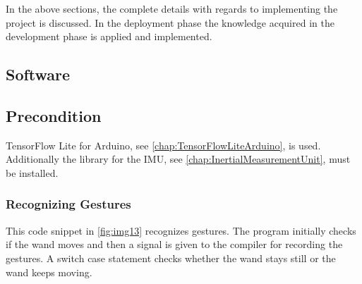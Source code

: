 In the above sections, the complete details with regards to implementing the project is discussed. In the deployment phase the knowledge acquired in the development phase is applied and implemented. 

%

\subsection{Software}

\subsection{Precondition}

TensorFlow Lite for Arduino, see \ref{chap:TensorFlowLiteArduino}, is used. Additionally the library for the IMU, see \ref{chap:InertialMeasurementUnit}, must be installed.







\subsubsection{Recognizing Gestures}

This code snippet in \ref{fig:img13} recognizes gestures. The program initially checks if the wand moves and then a signal is given to the compiler for recording the gestures. A switch case statement checks whether the wand stays still or the wand keeps moving.

